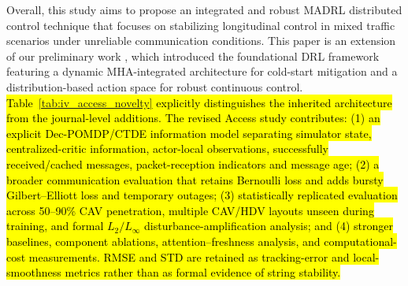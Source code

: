 \documentclass{ieeeaccess}
\begin{document}
Overall, this study aims to propose an integrated and robust MADRL distributed control technique that focuses on stabilizing longitudinal control in mixed traffic scenarios under unreliable communication conditions. This paper is an extension of our preliminary work \cite{cai2026integrating}, which introduced the foundational DRL framework featuring a dynamic MHA-integrated architecture for cold-start mitigation and a distribution-based action space for robust continuous control. \hl{Table~\ref{tab:iv_access_novelty} explicitly distinguishes the inherited architecture from the journal-level additions. The revised Access study contributes: (1) an explicit Dec-POMDP/CTDE information model separating simulator state, centralized-critic information, actor-local observations, successfully received/cached messages, packet-reception indicators and message age; (2) a broader communication evaluation that retains Bernoulli loss and adds bursty Gilbert--Elliott loss and temporary outages; (3) statistically replicated evaluation across 50--90\% CAV penetration, multiple CAV/HDV layouts unseen during training, and formal $L_2/L_\infty$ disturbance-amplification analysis; and (4) stronger baselines, component ablations, attention--freshness analysis, and computational-cost measurements. RMSE and STD are retained as tracking-error and local-smoothness metrics rather than as formal evidence of string stability.}
\end{document}
